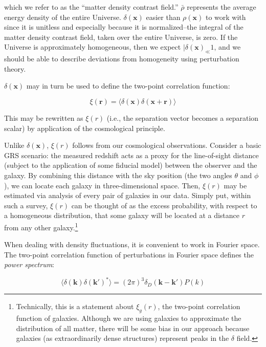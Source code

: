 which we refer to as the ``matter density contrast field.'' $\bar{\rho}$
represents the average energy density of the entire Universe. 
$\delta(\bm{x})$ easier than $\rho(\bm{x})$ to work with since it
is unitless and especially because it is normalized--the integral of the
matter density contrast field, taken over the entire Universe, is zero.
If the Universe is approximately homogeneous, then we expect
$|\delta(\bm{x})_ \ll 1$, and we should be able to describe
deviations from homogeneity using perturbation theory.

$\delta(\bm{x})$ may in turn be used to define the two-point correlation 
function:

\begin{equation}
\xi(\bm{r})
=
\langle \delta (\mathbf{x}) \delta(\mathbf{x} + \mathbf{r})\rangle
\end{equation}

This may be rewritten as $\xi(r)$ (i.e., the separation vector becomes a
separation scalar) by application of the cosmological principle.

Unlike $\delta(\bm{x})$, $\xi(r)$ follows from our cosmological
observations. Consider a basic GRS scenario: the
measured redshift acts as a proxy for the line-of-sight distance (subject to
the application of some fiducial model) between the observer and the galaxy. 
By combining this distance with the sky position (the two angles $\theta$ and
$\phi$), we can locate each galaxy in three-dimensional space. Then, $\xi(r)$ 
may be estimated via analysis of every pair of galaxies in our data. Simply
put, within such a survey, $\xi(r)$ can be thought
of as the excess probability, with respect to a homogeneous distribution, that 
some galaxy will be located at a distance $r$ from any other
galaxy.\footnote{Technically, this is a statement
about $\xi_g(r)$, the two-point correlation function of galaxies. Although we
are using galaxies to approximate the distribution of all matter, there will
be some bias in our approach because galaxies (as extraordinarily dense 
structures) represent peaks in the $\delta$ field.}

When dealing with density fluctuations, it is convenient to work in Fourier
space. The two-point correlation
function of perturbations in Fourier space
defines the \textit{power spectrum}:

\begin{equation}
\langle \delta (\bm{k}) \delta (\bm{k}')^* \rangle
=
(2 \pi)^3 \delta_D (\bm{k} - \bm{k}') P(k)
\end{equation}

